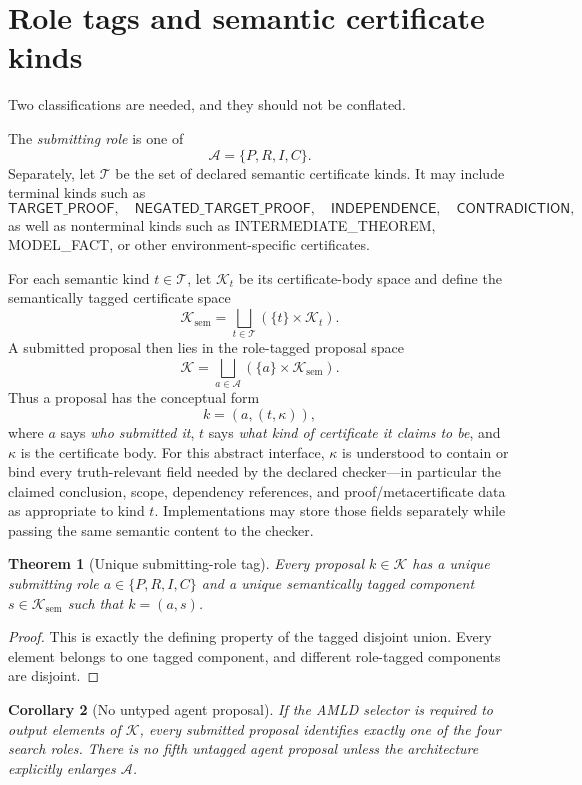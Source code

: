 \documentclass[11pt,openany]{book}
\newtheorem{theorem}{Theorem}[chapter]
\newtheorem{corollary}[theorem]{Corollary}
\theoremstyle{definition}
\theoremstyle{remark}
\newcommand{\Cert}{\mathcal{K}}
\newcommand{\Agents}{\mathcal{A}}
\begin{document}
\section{Role tags and semantic certificate kinds}
Two classifications are needed, and they should not be conflated.

The \emph{submitting role} is one of
\[
\Agents=\{P,R,I,C\}.
\]
Separately, let $\mathcal T$ be the set of declared semantic certificate kinds. It may include terminal kinds such as
\[
\mathsf{TARGET\_PROOF},\quad
\mathsf{NEGATED\_TARGET\_PROOF},\quad
\mathsf{INDEPENDENCE},\quad
\mathsf{CONTRADICTION},
\]
as well as nonterminal kinds such as \textsf{INTERMEDIATE\_THEOREM}, \textsf{MODEL\_FACT}, or other environment-specific certificates.

For each semantic kind $t\in\mathcal T$, let $\Cert_t$ be its certificate-body space and define the semantically tagged certificate space
\[
\Cert_{\mathrm{sem}}
=\bigsqcup_{t\in\mathcal T}(\{t\}\times\Cert_t).
\]
A submitted proposal then lies in the role-tagged proposal space
\[
\Cert
=\bigsqcup_{a\in\Agents}(\{a\}\times\Cert_{\mathrm{sem}}).
\]
Thus a proposal has the conceptual form
\[
k=(a,(t,\kappa)),
\]
where $a$ says \emph{who submitted it}, $t$ says \emph{what kind of certificate it claims to be}, and $\kappa$ is the certificate body. For this abstract interface, $\kappa$ is understood to contain or bind every truth-relevant field needed by the declared checker---in particular the claimed conclusion, scope, dependency references, and proof/metacertificate data as appropriate to kind $t$. Implementations may store those fields separately while passing the same semantic content to the checker.

\begin{theorem}[Unique submitting-role tag]\label{thm:uniquerole}
Every proposal $k\in\Cert$ has a unique submitting role $a\in\{P,R,I,C\}$ and a unique semantically tagged component $s\in\Cert_{\mathrm{sem}}$ such that $k=(a,s)$.
\end{theorem}
\begin{proof}
This is exactly the defining property of the tagged disjoint union. Every element belongs to one tagged component, and different role-tagged components are disjoint.
\end{proof}

\begin{corollary}[No untyped agent proposal]\label{cor:nountyped}
If the AMLD selector is required to output elements of $\Cert$, every submitted proposal identifies exactly one of the four search roles. There is no fifth untagged agent proposal unless the architecture explicitly enlarges $\Agents$.
\end{corollary}
\end{document}
